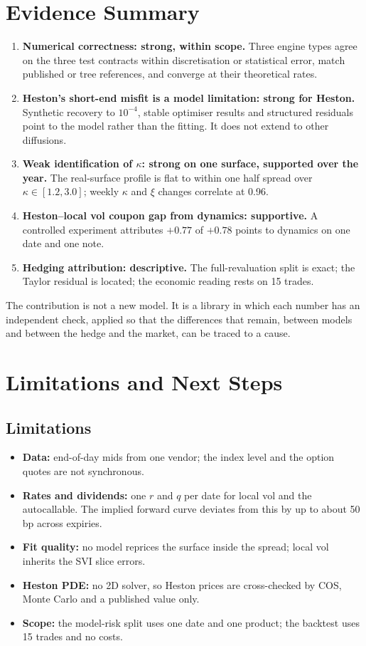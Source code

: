 \documentclass[10pt,letterpaper]{article}
\begin{document}
\section{Evidence Summary}\label{sec:evidence}
\begin{enumerate}
\item \textbf{Numerical correctness: strong, within scope.} Three engine types agree on the three test contracts within
discretisation or statistical error, match published or tree references, and converge at their theoretical rates.
\item \textbf{Heston's short-end misfit is a model limitation: strong for Heston.} Synthetic recovery to $10^{-4}$, stable
optimiser results and structured residuals point to the model rather than the fitting. It does not extend to other
diffusions.
\item \textbf{Weak identification of $\kappa$: strong on one surface, supported over the year.} The real-surface profile is flat
to within one half spread over $\kappa \in [1.2, 3.0]$; weekly $\kappa$ and $\xi$ changes correlate at 0.96.
\item \textbf{Heston--local vol coupon gap from dynamics: supportive.} A controlled experiment attributes $+0.77$ of $+0.78$
points to dynamics on one date and one note.
\item \textbf{Hedging attribution: descriptive.} The full-revaluation split is exact; the Taylor residual is located; the
economic reading rests on 15 trades.
\end{enumerate}
The contribution is not a new model. It is a library in which each number has an independent check, applied so that the
differences that remain, between models and between the hedge and the market, can be traced to a cause.

\section{Limitations and Next Steps}
\subsection{Limitations}
\begin{itemize}
\item \textbf{Data:} end-of-day mids from one vendor; the index level and the option quotes are not synchronous.
\item \textbf{Rates and dividends:} one $r$ and $q$ per date for local vol and the autocallable. The implied forward curve deviates
from this by up to about 50 bp across expiries.
\item \textbf{Fit quality:} no model reprices the surface inside the spread; local vol inherits the SVI slice errors.
\item \textbf{Heston PDE:} no 2D solver, so Heston prices are cross-checked by COS, Monte Carlo and a published value only.
\item \textbf{Scope:} the model-risk split uses one date and one product; the backtest uses 15 trades and no costs.
\end{itemize}
\end{document}
